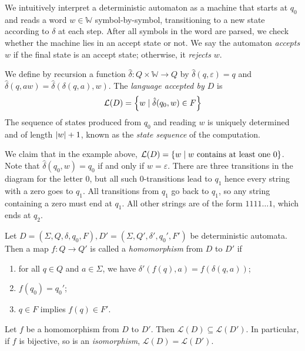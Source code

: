 We intuitively interpret a deterministic automaton as a machine that starts at \( q_0 \) and reads a word \( w \in \mathbb W \) symbol-by-symbol, transitioning to a new state according to \( \delta \) at each step.
After all symbols in the word are parsed, we check whether the machine lies in an accept state or not.
We say the automaton \emph{accepts} \( w \) if the final state is an accept state; otherwise, it \emph{rejects} \( w \).
\begin{definition}
	We define by recursion a function \( \hat\delta \colon Q \times \mathbb W \to Q \) by \( \hat\delta(q,\varepsilon) = q \) and \( \hat\delta(q,aw) = \hat\delta(\delta(q,a),w) \).
	The \emph{language accepted by \( D \)} is
	\[ \mathcal L(D) = \qty{w \mid \hat \delta(q_0, w) \in F} \]
	The sequence of states produced from \( q_0 \) and reading \( w \) is uniquely determined and of length \( \abs{w} + 1 \), known as the \emph{state sequence} of the computation.
\end{definition}
We claim that in the example above, \( \mathcal L(D) = \qty{w \mid w \text{ contains at least one } 0} \).
Note that \( \hat\delta(q_0,w) = q_0 \) if and only if \( w = \varepsilon \).
There are three transitions in the diagram for the letter 0, but all such 0-transitions lead to \( q_1 \) hence every string with a zero goes to \( q_1 \).
All transitions from \( q_1 \) go back to \( q_1 \), so any string containing a zero must end at \( q_1 \).
All other strings are of the form \( 1111\dots 1 \), which ends at \( q_2 \).
\begin{definition}
	Let \( D = (\Sigma, Q, \delta, q_0, F), D' = (\Sigma, Q', \delta', q_0', F') \) be deterministic automata.
	Then a map \( f \colon Q \to Q' \) is called a \emph{homomorphism} from \( D \) to \( D' \) if
	\begin{enumerate}
		\item for all \( q \in Q \) and \( a \in \Sigma \), we have \( \delta'(f(q),a) = f(\delta(q,a)) \);
		\item \( f(q_0) = q_0' \);
		\item \( q \in F \) implies \( f(q) \in F' \).
	\end{enumerate}
\end{definition}
\begin{proposition}
	Let \( f \) be a homomorphism from \( D \) to \( D' \).
	Then \( \mathcal L(D) \subseteq \mathcal L(D') \).
	In particular, if \( f \) is bijective, so is an \emph{isomorphism}, \( \mathcal L(D) = \mathcal L(D') \).
\end{proposition}
